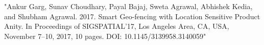 
\begin{cventries}

  \cventry
    {} %
    {} %
    {} %
    {} %
    {"Ankur Garg, Sunav Choudhary, Payal Bajaj, Sweta Agrawal, Abhishek Kedia,
    	and Shubham Agrawal. 2017. Smart Geo-fencing with Location Sensitive
    	Product Anity. In Proceedings of SIGSPATIAL’17, Los Angeles Area, CA,
    	USA, November 7–10, 2017, 10 pages.
    	DOI: 10.1145/3139958.3140059"}

\end{cventries}
